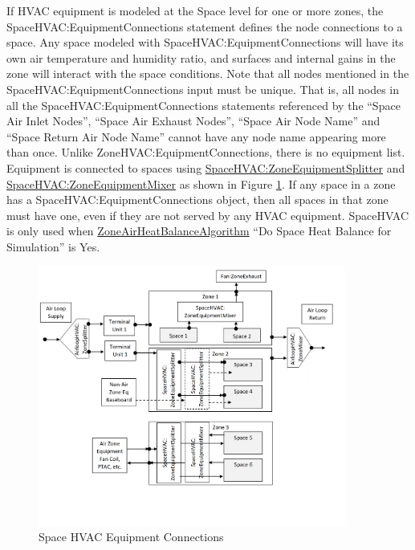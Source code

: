 If HVAC equipment is modeled at the Space level for one or more zones, the SpaceHVAC:EquipmentConnections statement defines the node connections to a space. Any space modeled with SpaceHVAC:EquipmentConnections will have its own air temperature and humidity ratio, and surfaces and internal gains in the zone will interact with the space conditions.
Note that all nodes mentioned in the SpaceHVAC:EquipmentConnections input must be unique. That is, all nodes in all the SpaceHVAC:EquipmentConnections statements referenced by the ``Space Air Inlet Nodes'', ``Space Air Exhaust Nodes'', ``Space Air Node Name'' and ``Space Return Air Node Name'' cannot have any node name appearing more than once. Unlike ZoneHVAC:EquipmentConnections, there is no equipment list. Equipment is connected to spaces using \hyperref[spacehvaczoneequipmentsplitter]{SpaceHVAC:ZoneEquipmentSplitter} and \hyperref[spacehvaczoneequipmentmixer]{SpaceHVAC:ZoneEquipmentMixer} as shown in Figure \ref{fig:space-hvac-equipment-connections}. If any space in a zone has a SpaceHVAC:EquipmentConnections object, then all spaces in that zone must have one, even if they are not served by any HVAC equipment. SpaceHVAC is only used when \hyperref[zoneairheatbalancealgorithm]{ZoneAirHeatBalanceAlgorithm} ``Do Space Heat Balance for Simulation'' is Yes.

\begin{figure}[hbtp]
\centering
\includegraphics[width=0.9\textwidth, height=0.9\textheight, keepaspectratio=true]{media/SpaceHVACSchematic2.png}
\caption{Space HVAC Equipment Connections \protect \label{fig:space-hvac-equipment-connections}}
\end{figure}


